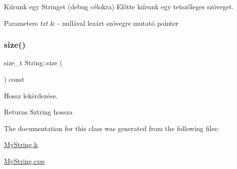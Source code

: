 Kiírunk egy Stringet (debug célokra) Előtte kiírunk egy tetszőleges szöveget. 
\begin{DoxyParams}{Parameters}
{\em txt} & -\/ nullával lezárt szövegre mutató pointer \\
\hline
\end{DoxyParams}
\mbox{\label{class_string_a588c5cc9faededbb9d938662d354feed}} 
\subsubsection{\texorpdfstring{size()}{size()}}
{\footnotesize\ttfamily size\+\_\+t String\+::size (\begin{DoxyParamCaption}{ }\end{DoxyParamCaption}) const\hspace{0.3cm}{\ttfamily [inline]}}

Hossz lekérdezése. \begin{DoxyReturn}{Returns}
Sztring hossza 
\end{DoxyReturn}


The documentation for this class was generated from the following files\+:\begin{DoxyCompactItemize}
\item 
\mbox{\hyperlink{_my_string_8h}{My\+String.\+h}}\item 
\mbox{\hyperlink{_my_string_8cpp}{My\+String.\+cpp}}\end{DoxyCompactItemize}
